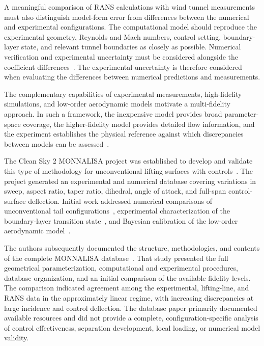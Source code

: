 \documentclass[journal ]{new-aiaa}
\begin{document}
A meaningful comparison of RANS calculations with wind tunnel measurements must also distinguish model-form error from differences between the numerical and experimental configurations. 
The computational model should reproduce the experimental geometry, Reynolds and Mach numbers, control setting, boundary-layer state, and relevant tunnel boundaries as closely as possible. 
Numerical verification and experimental uncertainty must be considered alongside the coefficient differences~\citep{ClarkEtAl2020}. 
The experimental uncertainty is therefore considered when evaluating the differences between numerical predictions and measurements.

The complementary capabilities of experimental measurements, high-fidelity simulations, and low-order aerodynamic models motivate a multi-fidelity approach. 
In such a framework, the inexpensive model provides broad parameter-space coverage, the higher-fidelity model provides detailed flow information, and the experiment establishes the physical reference against which discrepancies between models can be assessed~\citep{PeherstorferWillcoxGunzburger2018}. 

The Clean Sky 2 MONNALISA project was established to develop and validate this type of methodology for unconventional lifting surfaces with controls~\cite{auteri2022monnalisa}. 
The project generated an experimental and numerical database covering variations in sweep, aspect ratio, taper ratio, dihedral, angle of attack, and full-span control-surface deflection. 
Initial work addressed numerical comparisons of unconventional tail configurations~\citep{RausaEtAl2022}, experimental characterization of the boundary-layer transition state~\citep{ZanottiEtAl2022}, and Bayesian calibration of the low-order aerodynamic model~\citep{GoriEtAl2023}.

The authors subsequently documented the structure, methodologies, and contents of the complete MONNALISA database~\citep{rausa2026monnalisa}.
That study presented the full geometrical parameterization, computational and experimental procedures, database organization, and an initial comparison of the available fidelity levels. 
The comparison indicated agreement among the experimental, lifting-line, and RANS data in the approximately linear regime, with increasing discrepancies at large incidence and control deflection.
The database paper primarily documented available resources and did not provide a complete, configuration-specific analysis of control effectiveness, separation development, local loading, or numerical model validity.
\end{document}
